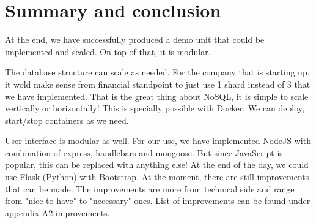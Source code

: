 \section{Summary and conclusion}
At the end, we have successfully produced a demo unit that could be implemented and scaled. On top of that, it is modular.

The database structure can scale as needed. For the company that is starting up, it wold make sense from financial standpoint to just use 1 shard instead of 3 that we have implemented. That is the great thing about NoSQL, it is simple to scale vertically or horizontally! This is specially possible with Docker. We can deploy, start/stop containers as we need.

User interface is modular as well. For our use, we have implemented NodeJS with combination of express, handlebars and mongoose. But since JavaScript is popular, this can be replaced with anything else! At the end of the day, we could use Flask (Python) with Bootstrap.
\newline
\newline
At the moment, there are still improvements that can be made. The improvements are more from technical side and range from "nice to have" to "necessary" ones. List of improvements can be found under appendix A2-improvements.